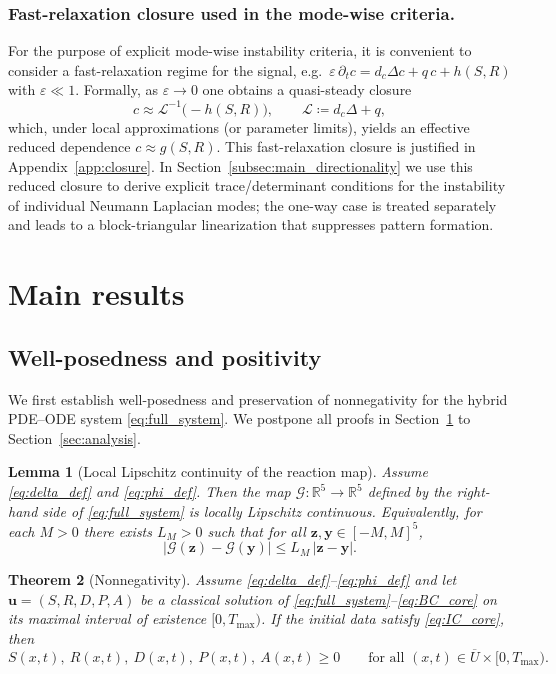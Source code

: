 \documentclass[pdflatex,sn-mathphys-ay]{sn-jnl}
\theoremstyle{thmstyleone}
\newtheorem{theorem}{Theorem}[section]
\newtheorem{lemma}[theorem]{Lemma}
\theoremstyle{definition}
\theoremstyle{remark}
\begin{document}
\subsubsection{Fast-relaxation closure used in the mode-wise criteria.}
For the purpose of explicit mode-wise instability criteria, it is convenient to consider a fast-relaxation regime for
the signal, e.g.\ $\varepsilon\,\partial_t c=d_c\Delta c+q\,c+h(S,R)$ with $\varepsilon\ll 1$.
Formally, as $\varepsilon\to0$ one obtains a quasi-steady closure
\[
c \approx \mathcal{L}^{-1}\!\bigl(-h(S,R)\bigr), \qquad \mathcal{L}\coloneqq d_c\Delta + q,
\]
which, under local approximations (or parameter limits), yields an effective reduced dependence $c\approx g(S,R)$.
This fast-relaxation closure is justified in Appendix~\ref{app:closure}.
In Section~\ref{subsec:main_directionality} we use this reduced closure to derive explicit trace/determinant conditions for the instability
of individual Neumann Laplacian modes; the one-way case is treated separately and leads to a block-triangular linearization
that suppresses pattern formation.

\section{Main results} \label{sec:main_results}

\subsection{Well-posedness and positivity}
\label{subsec:main_pos_wellposed}

We first establish well-posedness and preservation of nonnegativity for the hybrid PDE--ODE system \eqref{eq:full_system}. We postpone all proofs in Section~\ref{sec:main_results} to Section~\ref{sec:analysis}.

\begin{lemma}[Local Lipschitz continuity of the reaction map]
\label{lem:local_lipschitz}
Assume \eqref{eq:delta_def} and \eqref{eq:phi_def}. Then the map
$\mathcal{G}:\mathbb{R}^5\to\mathbb{R}^5$ defined by the right-hand side of \eqref{eq:full_system}
is locally Lipschitz continuous. Equivalently, for each $M>0$ there exists $L_M>0$ such that for all
$\mathbf{z},\mathbf{y}\in[-M,M]^5$,
\[
|\mathcal{G}(\mathbf{z})-\mathcal{G}(\mathbf{y})|\le L_M\,|\mathbf{z}-\mathbf{y}|.
\]
\end{lemma}

\begin{theorem}[Nonnegativity]\label{thm:positivity}
Assume \eqref{eq:delta_def}--\eqref{eq:phi_def} and let $\mathbf u=(S,R,D,P,A)$ be a classical solution of
\eqref{eq:full_system}--\eqref{eq:BC_core} on its maximal interval of existence $[0,T_{\max})$.
If the initial data satisfy \eqref{eq:IC_core}, then
\[
S(x,t),\ R(x,t),\ D(x,t),\ P(x,t),\ A(x,t)\ge 0
\qquad\text{for all }(x,t)\in \overline U\times[0,T_{\max}).
\]
\end{theorem}
\end{document}
